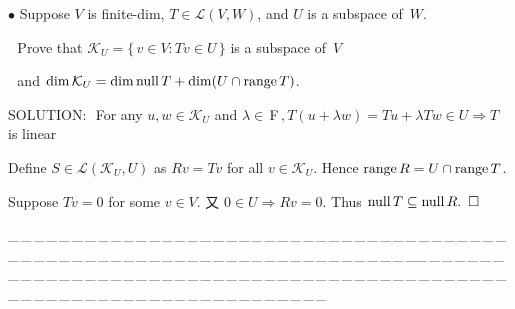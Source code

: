 \documentclass[a4paper, 11pt, UTF8]{article}
\def\range{\textup{range}\,}
\def\null{\textup{null\,}}
\def\Lm{\mathcal{L}}
\def\Fbf{$\,{\timesbf F}\,$}
\begin{document}
\begin{large}
{\small $\bullet$} {\timessl\Large 
Suppose $V$ is finite-dim, $T\in\Lm(V, W)$, and $U$ is a subspace of \,$W$.}\par\,\,
{\timessl\Large Prove that $\mathcal{K}_U=\{\,v\in V: Tv\in U\,\}$ is a subspace of \,$V$}\par\,\,
{\timessl\Large and $\dim\mathcal{K}_U=\dim\null T +\dim(U\cap\range T)$.
}\par
{\timesbf S\footnotesize{OLUTION:}}\,\,\,\,For any $u,w\in\mathcal{K}_U$ and $\lambda\in\Fbf,T(u+\lambda w)=Tu+\lambda Tw\in U\Rightarrow T$ is linear\par\qquad\qquad\quad
Define $S\in\Lm(\mathcal{K}_U,U)$ as $Rv=Tv$ for all $v\in\mathcal{K}_U$. Hence $\range R=U\cap \range T$.\par\qquad\qquad\quad
Suppose $Tv=0$ for some $v\in V$. 又 $0\in U\Rightarrow Rv=0$. Thus $\null T\subseteq\null R.\,\,\,\square$\par
{\tiny \_\,\_\,\_\,\_\,\_\,\_\,\_\,\_\,\_\,\_\,\_\,\_\,\_\,\_\,\_\,\_\,\_\,\_\,\_\,\_\,\_\,\_\,\_\,\_\,\_\,\_\,\_\,\_\,\_\,\_\,\_\,\_\,\_\,\_\,\_\,\_\,\_\,\_\,\_\,\_\,\_\,\_\,\_\,\_\,\_\,\_\,\_\,\_\,\_\,\_\,\_\,\_\,\_\,\_\,\_\,\_\,\_\,\_\,\_\,\_\,\_\,\_\,\_\,\_\,\_\,\_\,\_\,\_\,\_\,\_\,\_\_\,\_\,\_\,\_\,\_\,\_\,\_\,\_\,\_\,\_\,\_\,\_\,\_\,\_\,\_\,\_\,\_\,\_\,\_\,\_\,\_\,\_\,\_\,\_\,\_\,\_\,\_\,\_\,\_\,\_\,\_\,\_\,\_\,\_\,\_\,\_\,\_\,\_\,\_\,\_\,\_\,\_\,\_\,\_\,\_\,\_\,\_\,\_\,\_\,\_\,\_\,\_\,\_\,\_\,\_\,\_\,\_\,\_\,\_\,\_\,\_\,\_\,\_\,\_\,\_\,\_\,\_\,\_\,\_\,\_\,\_}\par\,\par{\tiny\,\par}


\end{large}
\end{document}
